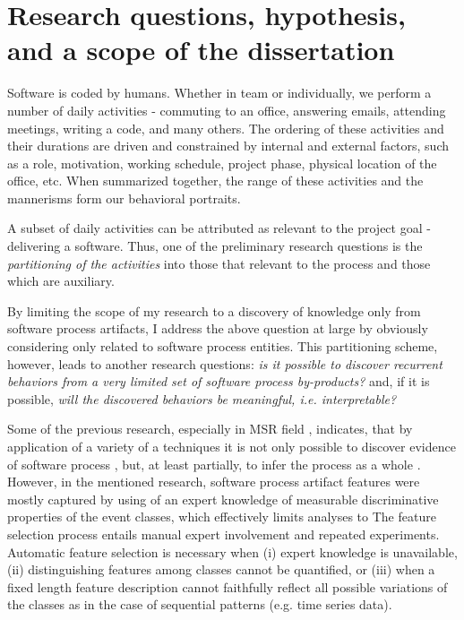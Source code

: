 \section{Research questions, hypothesis, and a scope of the dissertation}
Software is coded by humans. Whether in team or individually, we perform a number of daily activities - 
commuting to an office, answering emails, attending meetings, writing a code, and many others. 
The ordering of these activities and their durations are driven and constrained by internal and external factors, 
such as a role, motivation, working schedule, project phase, physical location of the office, etc. 
When summarized together, the range of these activities and the mannerisms form our behavioral portraits.

A subset of daily activities can be attributed as relevant to the project goal - delivering a software. 
Thus, one of the preliminary research questions is the \textit{partitioning of the activities} into those that 
relevant to the process and those which are auxiliary. 


By limiting the scope of my research to a discovery of knowledge only from software process artifacts, 
I address the above question at large by obviously considering only related to software process entities.
This partitioning scheme, however, leads to another research questions: \textit{is it possible to discover 
recurrent behaviors from a very limited set of software process by-products?} and, if it is possible, 
\textit{will the discovered behaviors be meaningful, i.e. interpretable?}

Some of the previous research, especially in MSR field  \cite{citeulike:9114115, citeulike:7853299}, 
indicates, that by application of a variety of a techniques it is not only possible to discover evidence of 
software process \cite{citeulike:9007622}, but, at least partially, to infer the process as a 
whole \cite{citeulike:5128808}. However, in the mentioned research, software process artifact features 
were mostly captured by using of an expert knowledge of measurable discriminative properties of the 
event classes, which effectively limits analyses to The feature selection
process entails manual expert involvement and repeated experiments. Automatic feature
selection is necessary when (i) expert knowledge is unavailable, (ii) distinguishing features
among classes cannot be quantified, or (iii) when a fixed length feature description cannot
faithfully reflect all possible variations of the classes as in the case of sequential patterns
(e.g. time series data).

